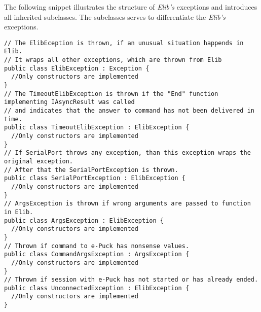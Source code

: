   The following snippet illustrates the structure of {\it Elib's} exceptions and
  introduces all inherited subclasses.
  The subclasses serves to differentiate the {\it Elib's} exceptions.
\begin{lstlisting}
// The ElibEception is thrown, if an unusual situation happends in Elib.
// It wraps all other exceptions, which are thrown from Elib
public class ElibException : Exception { 
  //Only constructors are implemented
}
// The TimeoutElibException is thrown if the "End" function implementing IAsyncResult was called 
// and indicates that the answer to command has not been delivered in time.
public class TimeoutElibException : ElibException { 
  //Only constructors are implemented
}
// If SerialPort throws any exception, than this exception wraps the original exception.
// After that the SerialPortException is thrown.
public class SerialPortException : ElibException {
  //Only constructors are implemented
}
// ArgsException is thrown if wrong arguments are passed to function in Elib.
public class ArgsException : ElibException {
  //Only constructors are implemented
}
// Thrown if command to e-Puck has nonsense values.
public class CommandArgsException : ArgsException {
  //Only constructors are implemented
}
// Thrown if session with e-Puck has not started or has already ended.
public class UnconnectedException : ElibException {
  //Only constructors are implemented
}

\end{lstlisting}
